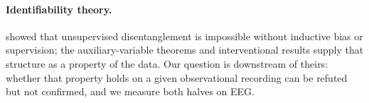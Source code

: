 \paragraph{Identifiability theory.}
\citet{locatello2019challenging} showed that unsupervised disentanglement is impossible without inductive bias or supervision; the auxiliary-variable theorems \citep{hyvarinen2016tcl,hyvarinen2019auxiliary,khemakhem2020ivae} and interventional results \citep{kugelgen2023nonparametric} supply that structure as a property of the data.
Our question is downstream of theirs: whether that property holds on a given observational recording can be refuted but not confirmed, and we measure both halves on EEG.
